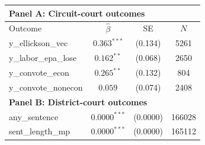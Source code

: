 \begin{tabular}{lccc}
\toprule
\multicolumn{4}{l}{\textbf{Panel A: Circuit-court outcomes}} \\
\midrule
Outcome & \(\hat{\beta}\) & SE & \(N\) \\
\midrule
y\_ellickson\_vec & \(0.363^{***}\) & (0.134) & 5261 \\
y\_labor\_epa\_lose & \(0.162^{**}\) & (0.068) & 2650 \\
y\_convote\_econ & \(0.265^{**}\) & (0.132) & 804 \\
y\_convote\_nonecon & \(0.059\) & (0.074) & 2408 \\
\midrule
\multicolumn{4}{l}{\textbf{Panel B: District-court outcomes}} \\
\midrule
any\_sentence & \(0.0000^{***}\) & (0.0000) & 166028 \\
sent\_length\_mp & \(0.0000^{***}\) & (0.0000) & 165112 \\
\bottomrule
\end{tabular}
